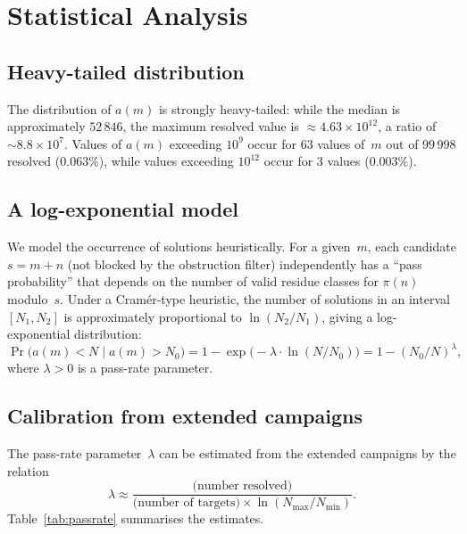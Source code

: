 \documentclass{amsart}
\theoremstyle{definition}
\theoremstyle{remark}
\numberwithin{equation}{section}
\begin{document}
\section{Statistical Analysis}
\label{sec:statistics}

\subsection{Heavy-tailed distribution}

The distribution of $a(m)$ is strongly heavy-tailed: while the
median is approximately $52\,846$, the maximum resolved value is
$\approx 4.63 \times 10^{12}$, a ratio of $\sim 8.8 \times 10^7$.
Values of $a(m)$ exceeding $10^9$ occur for $63$ values of~$m$
out of $99\,998$ resolved ($0.063\%$), while values exceeding
$10^{12}$ occur for $3$ values ($0.003\%$).

\subsection{A log-exponential model}

We model the occurrence of solutions heuristically.
For a given~$m$, each candidate $s = m + n$ (not blocked by the
obstruction filter) independently has a ``pass probability'' that
depends on the number of valid residue classes for $\pi(n)$
modulo~$s$.  Under a Cram\'er-type heuristic, the number of
solutions in an interval $[N_1, N_2]$ is approximately proportional
to $\ln(N_2/N_1)$, giving a log-exponential distribution:
\begin{equation}\label{eq:logexp}
\Pr\bigl(a(m) < N \mid a(m) > N_0\bigr)
= 1 - \exp\bigl(-\lambda \cdot \ln(N/N_0)\bigr)
= 1 - (N_0/N)^{\lambda},
\end{equation}
where $\lambda > 0$ is a pass-rate parameter.

\subsection{Calibration from extended campaigns}

The pass-rate parameter~$\lambda$ can be estimated from the
extended campaigns by the relation
\[
\lambda \approx
\frac{\text{(number resolved)}}
     {\text{(number of targets)} \times \ln(N_{\max}/N_{\min})}.
\]
Table~\ref{tab:passrate} summarises the estimates.
\end{document}
